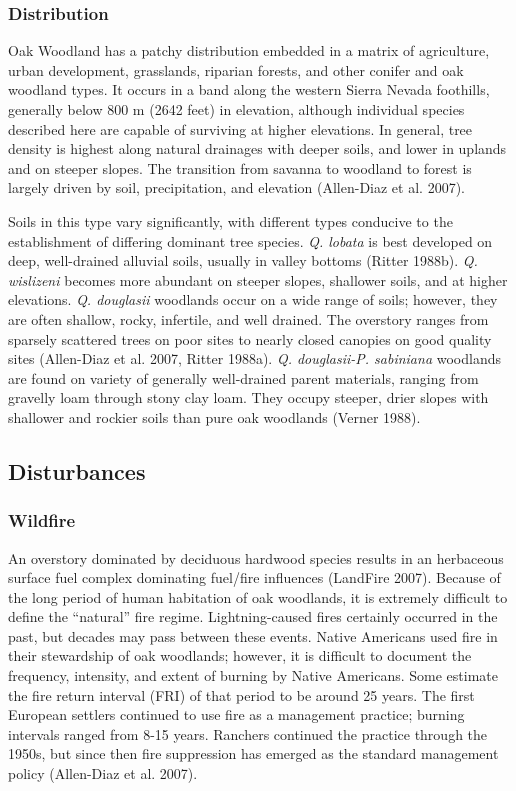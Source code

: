 \subsubsection{Distribution}
Oak Woodland has a patchy distribution embedded in a matrix of agriculture, urban development, grasslands, riparian forests, and other conifer and oak woodland types. It occurs in a band along the western Sierra Nevada foothills, generally below 800 m (2642 feet) in elevation, although individual species described here are capable of surviving at higher elevations. In general, tree density is highest along natural drainages with deeper soils, and lower in uplands and on steeper slopes. The transition from savanna to woodland to forest is largely driven by soil, precipitation, and elevation (Allen-Diaz et al. 2007).

Soils in this type vary significantly, with different types conducive to the establishment of differing dominant tree species. \emph{Q. lobata} is best developed on deep, well-drained alluvial soils, usually in valley bottoms (Ritter 1988b). \emph{Q. wislizeni} becomes more abundant on steeper slopes, shallower soils, and at higher elevations. \emph{Q. douglasii} woodlands occur on a wide range of soils; however, they are often shallow, rocky, infertile, and well drained. The overstory ranges from sparsely scattered trees on poor sites to nearly closed canopies on good quality sites (Allen-Diaz et al. 2007, Ritter 1988a). \emph{Q. douglasii-P. sabiniana} woodlands are found on variety of generally well-drained parent materials, ranging from gravelly loam through stony clay loam. They occupy steeper, drier slopes with shallower and rockier soils than pure oak woodlands (Verner 1988). 


\subsection*{Disturbances}

\subsubsection{Wildfire}
An overstory dominated by deciduous hardwood species results in an herbaceous surface fuel complex dominating fuel/fire influences (LandFire 2007). Because of the long period of human habitation of oak woodlands, it is extremely difficult to define the ``natural'' fire regime. Lightning-caused fires certainly occurred in the past, but decades may pass between these events. Native Americans used fire in their stewardship of oak woodlands; however, it is difficult to document the frequency, intensity, and extent of burning by Native Americans. Some estimate the fire return interval (FRI) of that period to be around 25 years. The first European settlers continued to use fire as a management practice; burning intervals ranged from 8-15 years. Ranchers continued the practice through the 1950s, but since then fire suppression has emerged as the standard management policy (Allen-Diaz et al. 2007).  

